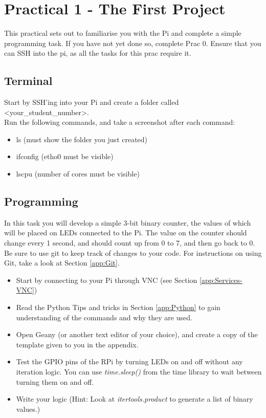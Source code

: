 \section{Practical 1 - The First Project}
This practical sets out to familiarise you with the Pi and complete a simple programming task. If you have not yet done so, complete Prac 0. Ensure that you can SSH into the pi, as all the tasks for this prac require it.


\subsection{Terminal}
\label{sec:Prac1:Terminal}
Start by SSH'ing into your Pi and create a folder called \textless your\_student\_number\textgreater.\\
Run the following commands, and take a screenshot after each command:
\begin{itemize}
    \item ls (must show the folder you just created)
    \item ifconfig (etho0 must be visible)
    \item lscpu (number of cores must be visible)
\end{itemize}

\subsection{Programming}
In this task you will develop a simple 3-bit binary counter, the values of which will be placed on LEDs connected to the Pi. The value on the counter should change every 1 second, and should count up from 0 to 7, and then go back to 0.
Be sure to use git to keep track of changes to your code. For instructions on using Git, take a look at Section \ref{app:Git}.
\begin{itemize}
    \item Start by connecting to your Pi through VNC (see Section \ref{app:Services-VNC})
    \item Read the Python Tips and tricks in Section \ref{app:Python} to gain understanding of the commands and why they are used.
    \item Open Geany (or another text editor of your choice), and create a copy of the template given to you in the appendix.
    \item Test the GPIO pins of the RPi by turning LEDs on and off without any iteration logic. You can use \textit{time.sleep()} from the time library to wait between turning them on and off.
    \item Write your logic (Hint: Look at \textit{itertools.product} to generate a list of binary values.)
\end{itemize}

